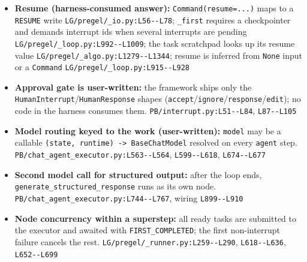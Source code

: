 \begin{itemize}
\item \textbf{Resume (harness-consumed answer):} \texttt{Command(\allowbreak{}resume=.\allowbreak{}.\allowbreak{}.\allowbreak{})} maps to a \texttt{RESUME} write \texttt{LG/\allowbreak{}pregel/\allowbreak{}\_\allowbreak{}io.\allowbreak{}py:\allowbreak{}L56-\allowbreak{}-\allowbreak{}L78}; \texttt{\_\allowbreak{}first} requires a checkpointer and demands interrupt ids when several interrupts are pending \texttt{LG/\allowbreak{}pregel/\allowbreak{}\_\allowbreak{}loop.\allowbreak{}py:\allowbreak{}L992-\allowbreak{}-\allowbreak{}L1009}; the task scratchpad looks up its resume value \texttt{LG/\allowbreak{}pregel/\allowbreak{}\_\allowbreak{}algo.\allowbreak{}py:\allowbreak{}L1279-\allowbreak{}-\allowbreak{}L1344}; resume is inferred from \texttt{None} input or a \texttt{Command} \texttt{LG/\allowbreak{}pregel/\allowbreak{}\_\allowbreak{}loop.\allowbreak{}py:\allowbreak{}L915-\allowbreak{}-\allowbreak{}L928}
\item \textbf{Approval gate is user-written:} the framework ships only the \texttt{HumanInterrupt}/\texttt{HumanResponse} shapes (\texttt{accept}/\texttt{ignore}/\texttt{response}/\texttt{edit}); no code in the harness consumes them. \texttt{PB/\allowbreak{}interrupt.\allowbreak{}py:\allowbreak{}L51-\allowbreak{}-\allowbreak{}L84}, \texttt{L87-\allowbreak{}-\allowbreak{}L105}
\item \textbf{Model routing keyed to the work (user-written):} \texttt{model} may be a callable \texttt{(\allowbreak{}state, runtime) -\allowbreak{}> BaseChatModel} resolved on every \texttt{agent} step. \texttt{PB/\allowbreak{}chat\_\allowbreak{}agent\_\allowbreak{}executor.\allowbreak{}py:\allowbreak{}L563-\allowbreak{}-\allowbreak{}L564}, \texttt{L599-\allowbreak{}-\allowbreak{}L618}, \texttt{L674-\allowbreak{}-\allowbreak{}L677}
\item \textbf{Second model call for structured output:} after the loop ends, \texttt{generate\_\allowbreak{}structured\_\allowbreak{}response} runs as its own node. \texttt{PB/\allowbreak{}chat\_\allowbreak{}agent\_\allowbreak{}executor.\allowbreak{}py:\allowbreak{}L744-\allowbreak{}-\allowbreak{}L767}, wiring \texttt{L899-\allowbreak{}-\allowbreak{}L910}
\item \textbf{Node concurrency within a superstep:} all ready tasks are submitted to the executor and awaited with \texttt{FIRST\_\allowbreak{}COMPLETED}; the first non-interrupt failure cancels the rest. \texttt{LG/\allowbreak{}pregel/\allowbreak{}\_\allowbreak{}runner.\allowbreak{}py:\allowbreak{}L259-\allowbreak{}-\allowbreak{}L290}, \texttt{L618-\allowbreak{}-\allowbreak{}L636}, \texttt{L652-\allowbreak{}-\allowbreak{}L699}

\end{itemize}
